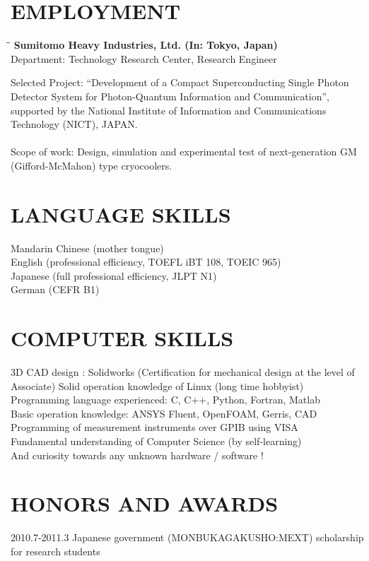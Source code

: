 \documentclass[12pt,A4]{res}
\makeatletter
\newlength\tdima
\newcommand\tabright[1]{%
      \setlength\tdima{\linewidth}%
      \addtolength\tdima{\@totalleftmargin}%
      \addtolength\tdima{-\dimen\@curtab}%
      \makebox[\tdima][r]{#1}}
\makeatother
\begin{document}
\begin{resume}
\section{EMPLOYMENT}
    \vspace{-0.1in}	    
    \begin{tabbing}
    \hspace{2.2in}\= \hspace{2.1in}\= \kill %
    {\bf Sumitomo Heavy Industries, Ltd. (In: Tokyo, Japan)} \> \tabright{2013.4-Present} \\
    Department: Technology Research Center, Research Engineer \\
   \end{tabbing}\vspace{-20pt}      %

    Selected Project: “Development of a Compact Superconducting Single Photon
    Detector System for Photon-Quantum Information and Communication”, supported by
    the National Institute of Information and Communications Technology (NICT), JAPAN. \\
    \\
    Scope of work: Design, simulation and experimental test of next-generation GM (Gifford-McMahon) type cryocoolers.\\   
     
\section{LANGUAGE SKILLS}
Mandarin Chinese (mother tongue) \\
English (professional efficiency, TOEFL iBT 108, TOEIC 965) \\
Japanese (full professional efficiency, JLPT N1) \\
German (CEFR B1)     

\section{COMPUTER SKILLS} 
3D CAD design : Solidworks (Certification for mechanical design at the level of Associate)
Solid operation knowledge of Linux (long time hobbyist) \\
Programming language experienced: C, C++, Python, Fortran, Matlab \\
Basic operation knowledge: ANSYS Fluent, OpenFOAM, Gerris, CAD \\
Programming of measurement instruments over GPIB using VISA \\
Fundamental understanding of Computer Science (by self-learning) \\
And curiosity towards any unknown hardware / software !
 
\section{HONORS AND AWARDS}          
2010.7-2011.3 Japanese government (MONBUKAGAKUSHO:MEXT) scholarship for research students\\

\end{resume}
\end{document}
